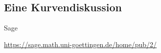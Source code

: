 \documentclass[notes=hide,hyperref={dvipdfmx,pdfpagelabels=false}]{beamer}
\begin{document}
\subsection{Eine Kurvendiskussion}

\begin{frame}[fragile]{Sage}
\begin{center}
\url{https://sage.math.uni-goettingen.de/home/pub/2/}
\end{center}
\end{frame}


%
%
%
%
\end{document}
